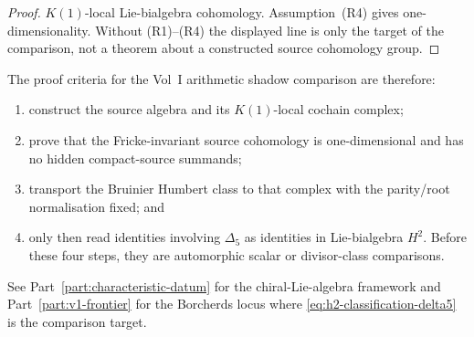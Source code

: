 \begin{remark}
\begin{proof}
$K(1)$-local Lie-bialgebra cohomology. Assumption~\textup{(R4)} gives
one-dimensionality. Without \textup{(R1)--(R4)} the displayed line is
only the target of the comparison, not a theorem about a constructed
source cohomology group.
\end{proof}
The proof criteria for the Vol~I arithmetic shadow comparison are
therefore:
\begin{enumerate}[label=\textup{(\roman*)}]
\item construct the source algebra and its $K(1)$-local
 cochain complex;
\item prove that the Fricke-invariant source cohomology is
 one-dimensional and has no hidden compact-source summands;
\item transport the Bruinier Humbert class to that complex with the
 parity/root normalisation fixed; and
\item only then read identities involving $\Delta_5$ as identities in
 Lie-bialgebra \(H^2\). Before these four steps, they are
 automorphic scalar or divisor-class comparisons.
\end{enumerate}
See Part~\ref{part:characteristic-datum} for the chiral-Lie-algebra
framework and Part~\ref{part:v1-frontier} for the Borcherds
locus where \eqref{eq:h2-classification-delta5} is the comparison
target.
\end{remark}

